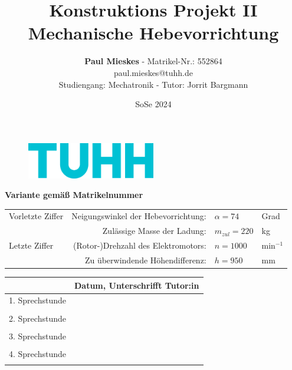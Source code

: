 \documentclass[11pt]{article} %
\title{Konstruktions Projekt II \\ \Huge \textbf{Mechanische Hebevorrichtung} }
\author{\textbf{Paul Mieskes} - Matrikel-Nr.: 552864 \\ paul.mieskes@tuhh.de \\ Studiengang: Mechatronik - Tutor: Jorrit Bargmann}
\date{SoSe 2024} %
\begin{document}
	
\begin{figure}
\centering
\includegraphics[width=0.5\textwidth]{tuhh.png}
\end{figure}

\maketitle

\centering
\textbf{Variante gemäß Matrikelnummer}\\

\begin{tabular}{| l r l l |}
	
	\hline
	Vorletzte Ziffer & Neigungswinkel der Hebevorrichtung: & $\alpha = 74$  & Grad\\
	& Zulässige Masse der Ladung: & $m_{zul} = 220 $ & kg \\
	\hline
	Letzte Ziffer & (Rotor-)Drehzahl des Elektromotors: & $ n = 1000 $ & min$^{-1}$ \\
	& Zu überwindende Höhendifferenz: & $ h = 950 $ & mm\\
	\hline
\end{tabular}
\vspace{1.5cm}


\begin{tabular}{ | l |  m{10cm}|}
 \hline 
 & Datum, Unterschrifft Tutor:in \\
 \hline 1. Sprechstunde & \\ &\\
 \hline 2. Sprechstunde & \\& \\
 \hline 3. Sprechstunde & \\ &\\
 \hline 4. Sprechstunde & \\ &\\
 \hline
 
\end{tabular}
\thispagestyle{empty} %



\raggedright %

\newpage
{}
\renewcommand*\contentsname{Inhaltsverzeichnis}
\tableofcontents

\newpage
{}
\setcounter{page}{1} %

%

\renewcommand{\glossaryname}{Bedeutung}%
\printnoidxglossary
\newpage
 
%
%


\newpage
\end{document}
